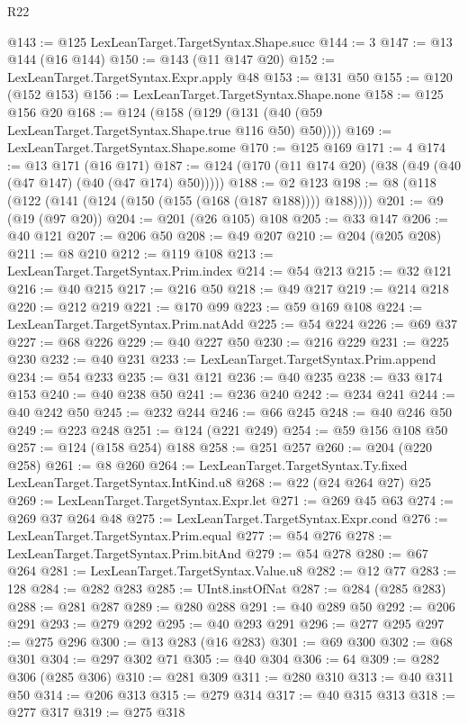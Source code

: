 \begin{lexlean}{R22}
\begin{coremodule}
@143 := @125 LexLeanTarget.TargetSyntax.Shape.succ
@144 := 3
@147 := @13 @144 (@16 @144)
@150 := @143 (@11 @147 @20)
@152 := LexLeanTarget.TargetSyntax.Expr.apply @48
@153 := @131 @50
@155 := @120 (@152 @153)
@156 := LexLeanTarget.TargetSyntax.Shape.none
@158 := @125 @156 @20
@168 := @124 (@158 (@129 (@131 (@40 (@59 LexLeanTarget.TargetSyntax.Shape.true @116 @50) @50))))
@169 := LexLeanTarget.TargetSyntax.Shape.some
@170 := @125 @169
@171 := 4
@174 := @13 @171 (@16 @171)
@187 := @124 (@170 (@11 @174 @20) (@38 (@49 (@40 (@47 @147) (@40 (@47 @174) @50)))))
@188 := @2 @123
@198 := @8 (@118 (@122 (@141 (@124 (@150 (@155 (@168 (@187 @188)))) @188))))
@201 := @9 (@19 (@97 @20))
@204 := @201 (@26 @105) @108
@205 := @33 @147
@206 := @40 @121
@207 := @206 @50
@208 := @49 @207
@210 := @204 (@205 @208)
@211 := @8 @210
@212 := @119 @108
@213 := LexLeanTarget.TargetSyntax.Prim.index
@214 := @54 @213
@215 := @32 @121
@216 := @40 @215
@217 := @216 @50
@218 := @49 @217
@219 := @214 @218
@220 := @212 @219
@221 := @170 @99
@223 := @59 @169 @108
@224 := LexLeanTarget.TargetSyntax.Prim.natAdd
@225 := @54 @224
@226 := @69 @37
@227 := @68 @226
@229 := @40 @227 @50
@230 := @216 @229
@231 := @225 @230
@232 := @40 @231
@233 := LexLeanTarget.TargetSyntax.Prim.append
@234 := @54 @233
@235 := @31 @121
@236 := @40 @235
@238 := @33 @174 @153
@240 := @40 @238 @50
@241 := @236 @240
@242 := @234 @241
@244 := @40 @242 @50
@245 := @232 @244
@246 := @66 @245
@248 := @40 @246 @50
@249 := @223 @248
@251 := @124 (@221 @249)
@254 := @59 @156 @108 @50
@257 := @124 (@158 @254) @188
@258 := @251 @257
@260 := @204 (@220 @258)
@261 := @8 @260
@264 := LexLeanTarget.TargetSyntax.Ty.fixed LexLeanTarget.TargetSyntax.IntKind.u8
@268 := @22 (@24 @264 @27) @25
@269 := LexLeanTarget.TargetSyntax.Expr.let
@271 := @269 @45 @63
@274 := @269 @37 @264 @48
@275 := LexLeanTarget.TargetSyntax.Expr.cond
@276 := LexLeanTarget.TargetSyntax.Prim.equal
@277 := @54 @276
@278 := LexLeanTarget.TargetSyntax.Prim.bitAnd
@279 := @54 @278
@280 := @67 @264
@281 := LexLeanTarget.TargetSyntax.Value.u8
@282 := @12 @77
@283 := 128
@284 := @282 @283
@285 := UInt8.instOfNat
@287 := @284 (@285 @283)
@288 := @281 @287
@289 := @280 @288
@291 := @40 @289 @50
@292 := @206 @291
@293 := @279 @292
@295 := @40 @293 @291
@296 := @277 @295
@297 := @275 @296
@300 := @13 @283 (@16 @283)
@301 := @69 @300
@302 := @68 @301
@304 := @297 @302 @71
@305 := @40 @304
@306 := 64
@309 := @282 @306 (@285 @306)
@310 := @281 @309
@311 := @280 @310
@313 := @40 @311 @50
@314 := @206 @313
@315 := @279 @314
@317 := @40 @315 @313
@318 := @277 @317
@319 := @275 @318

\end{coremodule}
\end{lexlean}
